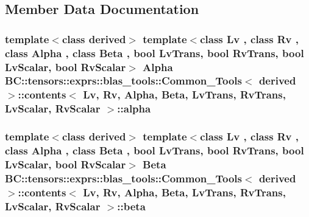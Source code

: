 \subsection{Member Data Documentation}
\subsubsection[{\texorpdfstring{alpha}{alpha}}]{\setlength{\rightskip}{0pt plus 5cm}template$<$class derived$>$ template$<$class Lv , class Rv , class Alpha , class Beta , bool Lv\+Trans, bool Rv\+Trans, bool Lv\+Scalar, bool Rv\+Scalar$>$ Alpha {\bf B\+C\+::tensors\+::exprs\+::blas\+\_\+tools\+::\+Common\+\_\+\+Tools}$<$ derived $>$\+::{\bf contents}$<$ Lv, Rv, Alpha, Beta, Lv\+Trans, Rv\+Trans, Lv\+Scalar, Rv\+Scalar $>$\+::alpha}\hypertarget{structBC_1_1tensors_1_1exprs_1_1blas__tools_1_1Common__Tools_1_1contents_ac45492874ff04efc96982451240a8fd8}{}\label{structBC_1_1tensors_1_1exprs_1_1blas__tools_1_1Common__Tools_1_1contents_ac45492874ff04efc96982451240a8fd8}
\subsubsection[{\texorpdfstring{beta}{beta}}]{\setlength{\rightskip}{0pt plus 5cm}template$<$class derived$>$ template$<$class Lv , class Rv , class Alpha , class Beta , bool Lv\+Trans, bool Rv\+Trans, bool Lv\+Scalar, bool Rv\+Scalar$>$ Beta {\bf B\+C\+::tensors\+::exprs\+::blas\+\_\+tools\+::\+Common\+\_\+\+Tools}$<$ derived $>$\+::{\bf contents}$<$ Lv, Rv, Alpha, Beta, Lv\+Trans, Rv\+Trans, Lv\+Scalar, Rv\+Scalar $>$\+::beta}\hypertarget{structBC_1_1tensors_1_1exprs_1_1blas__tools_1_1Common__Tools_1_1contents_ae9a126691a6939e6b7b554344d6ab84d}{}\label{structBC_1_1tensors_1_1exprs_1_1blas__tools_1_1Common__Tools_1_1contents_ae9a126691a6939e6b7b554344d6ab84d}
